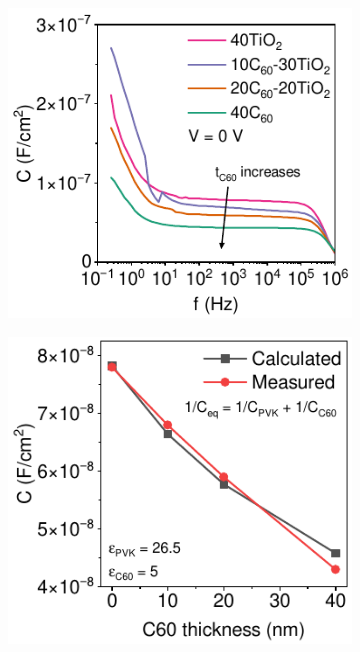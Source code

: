 \begin{figure}[htbp]
\begin{subfigure}[t]{0.37\textwidth}
        \caption{}
        \label{}
    \end{subfigure} 
    \begin{subfigure}[t]{0.44\textwidth}
        \centering
        \includegraphics[width=\textwidth]{chapters/transport_layers/images/Cf_comparison.pdf} %
        \caption{}
        \label{}
    \end{subfigure}
    \hspace{0.5cm}
    \begin{subfigure}[t]{0.4\textwidth}
        \centering
        \includegraphics[width=\textwidth]{chapters/transport_layers/images/C_f_c60_thick.pdf} %
        \caption{}
        \label{}
    \end{subfigure}
    \caption{}
    \label{fig:etl_opt:rise_time_and_capacitance}
\end{figure}

